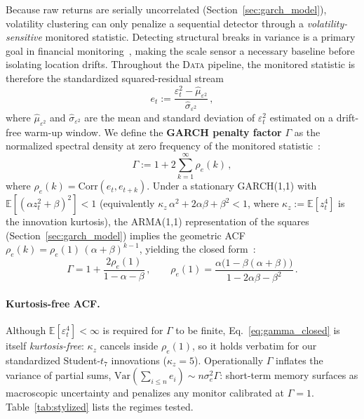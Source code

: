 \documentclass[sigconf,anonymous,review]{acmart}
\theoremstyle{acmdefinition}
\begin{document}
Because raw returns are serially uncorrelated (Section~\ref{sec:garch_model}), volatility clustering can only penalize a sequential detector through a \emph{volatility-sensitive} monitored statistic. Detecting structural breaks in variance is a primary goal in financial monitoring~\cite{andreou_ghysels_2002, horvath_2006}, making the scale sensor a necessary baseline before isolating location drifts.
Throughout the \textsc{Data} pipeline, the monitored statistic is therefore the standardized squared-residual stream
\begin{equation}\label{eq:monitored}
    e_t := \frac{\varepsilon_t^2 - \widehat{\mu}_{\varepsilon^2}}{\widehat{\sigma}_{\varepsilon^2}}\,,
\end{equation}
where $\widehat{\mu}_{\varepsilon^2}$ and $\widehat{\sigma}_{\varepsilon^2}$ are the mean and standard deviation of $\varepsilon_t^2$ estimated on a drift-free warm-up window.
We define the \textbf{GARCH penalty factor} $\Gamma$ as the normalized spectral density at zero frequency of the monitored statistic~\cite{newey_west_1987}:
\begin{equation}\label{eq:gamma}
    \Gamma := 1 + 2\sum_{k=1}^{\infty}\rho_e(k)\,,
\end{equation}
where $\rho_e(k) = \mathrm{Corr}(e_t, e_{t+k})$.
Under a stationary GARCH(1,1) with $\mathbb{E}[(\alpha z_t^2 + \beta)^2] < 1$ (equivalently $\kappa_z\,\alpha^2 + 2\alpha\beta + \beta^2 < 1$, where $\kappa_z := \mathbb{E}[z_t^4]$ is the innovation kurtosis), the ARMA(1,1) representation of the squares (Section~\ref{sec:garch_model}) implies the geometric ACF $\rho_e(k) = \rho_e(1)\,(\alpha+\beta)^{k-1}$, yielding the closed form~\cite{bollerslev_1986, francq_garch_2010}:
\begin{equation}\label{eq:gamma_closed}
    \Gamma = 1 + \frac{2\rho_e(1)}{1-\alpha-\beta}\,,
    \qquad
    \rho_e(1) = \frac{\alpha\bigl(1-\beta(\alpha+\beta)\bigr)}{1 - 2\alpha\beta - \beta^2}\,.
\end{equation}

\paragraph{Kurtosis-free ACF.}
Although $\mathbb{E}[\varepsilon_t^4] < \infty$ is required for $\Gamma$ to be finite, Eq.~\eqref{eq:gamma_closed} is itself \emph{kurtosis-free}: $\kappa_z$ cancels inside $\rho_e(1)$, so it holds verbatim for our standardized Student-$t_7$ innovations ($\kappa_z = 5$). Operationally $\Gamma$ inflates the variance of partial sums, $\mathrm{Var}(\sum_{i \le n} e_i) \sim n\sigma_e^2\Gamma$: short-term memory surfaces as macroscopic uncertainty and penalizes any monitor calibrated at $\Gamma = 1$. Table~\ref{tab:stylized} lists the regimes tested.
\end{document}
